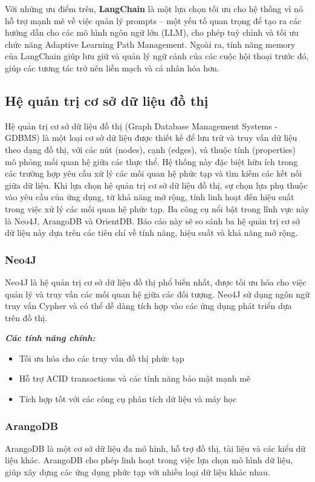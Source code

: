 Với những ưu điểm trên, \textbf{LangChain} là một lựa chọn tối ưu cho hệ thống vì nó hỗ trợ mạnh mẽ về việc quản lý prompts – một yếu tố quan trọng để tạo ra các hướng dẫn cho các mô hình ngôn ngữ lớn (LLM), cho phép tuỳ chỉnh và tối ưu chức năng Adaptive Learning Path Management. Ngoài ra, tính năng memory của LangChain giúp lưu giữ và quản lý ngữ cảnh của các cuộc hội thoại trước đó, giúp các tương tác trở nên liền mạch và cá nhân hóa hơn.
\subsection{Hệ quản trị cơ sở dữ liệu đồ thị}

Hệ quản trị cơ sở dữ liệu đồ thị (Graph Database Management Systems - GDBMS) là một loại cơ sở dữ liệu được thiết kế để lưu trữ và truy vấn dữ liệu theo dạng đồ thị, với các nút (nodes), cạnh (edges), và thuộc tính (properties) mô phỏng mối quan hệ giữa các thực thể. Hệ thống này đặc biệt hữu ích trong các trường hợp yêu cầu xử lý các mối quan hệ phức tạp và tìm kiếm các kết nối giữa dữ liệu. Khi lựa chọn hệ quản trị cơ sở dữ liệu đồ thị, sự chọn lựa phụ thuộc vào yêu cầu của ứng dụng, từ khả năng mở rộng, tính linh hoạt đến hiệu suất trong việc xử lý các mối quan hệ phức tạp. Ba công cụ nổi bật trong lĩnh vực này là Neo4J, ArangoDB và OrientDB. Báo cáo này sẽ so sánh ba hệ quản trị cơ sở dữ liệu này dựa trên các tiêu chí về tính năng, hiệu suất và khả năng mở rộng.

\subsubsection{Neo4J}
Neo4J là hệ quản trị cơ sở dữ liệu đồ thị phổ biến nhất, được tối ưu hóa cho việc quản lý và truy vấn các mối quan hệ giữa các đối tượng. Neo4J sử dụng ngôn ngữ truy vấn Cypher và có thể dễ dàng tích hợp vào các ứng dụng phát triển dựa trên đồ thị.

\par \textbf{\textit{Các tính năng chính:}} \begin{itemize} \item Tối ưu hóa cho các truy vấn đồ thị phức tạp \item Hỗ trợ ACID transactions và các tính năng bảo mật mạnh mẽ \item Tích hợp tốt với các công cụ phân tích dữ liệu và máy học \end{itemize}

\subsubsection{ArangoDB}
ArangoDB là một cơ sở dữ liệu đa mô hình, hỗ trợ đồ thị, tài liệu và các kiểu dữ liệu khác. ArangoDB cho phép linh hoạt trong việc lựa chọn mô hình dữ liệu, giúp xây dựng các ứng dụng phức tạp với nhiều loại dữ liệu khác nhau.

